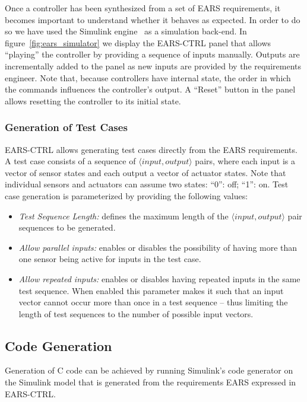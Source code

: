Once a controller has been synthesized from a set of EARS requirements, it
becomes important to understand whether it behaves as expected. In order to do
so we have used the Simulink engine~\cite{simulink} as a simulation back-end.
In figure~\ref{fig:ears_simulator} we display the \textsf{EARS-CTRL} panel that
allows ``playing'' the controller by providing a sequence of inputs manually.
Outputs are incrementally added to the panel as new inputs are provided by the
requirements engineer. Note that, because controllers have internal state,
the order in which the commands influences the controller's output. A ``Reset''
button in the panel allows resetting the controller to its initial state.

\subsubsection{Generation of Test Cases}

\textsf{EARS-CTRL} allows generating test cases directly from the EARS
requirements. A test case consists of a sequence of $\langle
input, output \rangle$ pairs, where each input is a vector of sensor states
and each output a vector of actuator states. Note that individual sensors and
actuators can assume two states: ``0'': off; ``1'': on. Test case generation
is parameterized by providing the following values:

\begin{itemize}
  \item \emph{Test Sequence Length:} defines the maximum length of the $\langle
  input, output \rangle$ pair sequences to be generated.
  \item \emph{Allow parallel inputs:} enables or disables the possibility of
  having more than one sensor being active for inputs in the test case.
  \item \emph{Allow repeated inputs:} enables or disables having repeated inputs
  in the same test sequence. When enabled this parameter makes it such that
  an input vector cannot occur more than once in a test sequence -- thus
  limiting the length of test sequences to the number of possible input vectors.
\end{itemize} 

\subsection{Code Generation}

Generation of C code can be achieved by running Simulink's code generator on the
Simulink model that is generated from the requirements EARS expressed in 
\textsf{EARS-CTRL}.
